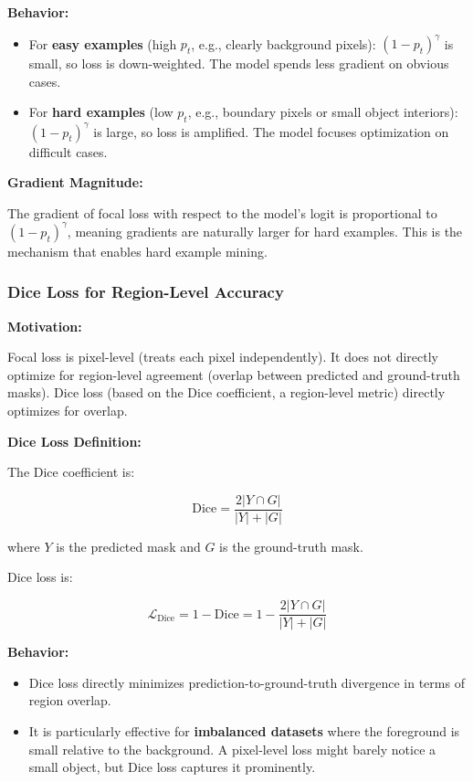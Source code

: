 \textbf{Behavior:}

\begin{itemize}
    \item For \textbf{easy examples} (high $p_t$, e.g., clearly background pixels): $(1 - p_t)^\gamma$ is small, so loss is down-weighted. The model spends less gradient on obvious cases.
    \item For \textbf{hard examples} (low $p_t$, e.g., boundary pixels or small object interiors): $(1 - p_t)^\gamma$ is large, so loss is amplified. The model focuses optimization on difficult cases.
\end{itemize}

\textbf{Gradient Magnitude:}

The gradient of focal loss with respect to the model's logit is proportional to $(1 - p_t)^\gamma$, meaning gradients are naturally larger for hard examples. This is the mechanism that enables hard example mining.

\subsubsection{Dice Loss for Region-Level Accuracy}

\textbf{Motivation:}

Focal loss is pixel-level (treats each pixel independently). It does not directly optimize for region-level agreement (overlap between predicted and ground-truth masks). Dice loss (based on the Dice coefficient, a region-level metric) directly optimizes for overlap.

\textbf{Dice Loss Definition:}

The Dice coefficient is:

\[ \text{Dice} = \frac{2|Y \cap G|}{|Y| + |G|} \]

where $Y$ is the predicted mask and $G$ is the ground-truth mask.

Dice loss is:

\[ \mathcal{L}_{\text{Dice}} = 1 - \text{Dice} = 1 - \frac{2|Y \cap G|}{|Y| + |G|} \]

\textbf{Behavior:}

\begin{itemize}
    \item Dice loss directly minimizes prediction-to-ground-truth divergence in terms of region overlap.
    \item It is particularly effective for \textbf{imbalanced datasets} where the foreground is small relative to the background. A pixel-level loss might barely notice a small object, but Dice loss captures it prominently.
\end{itemize}

